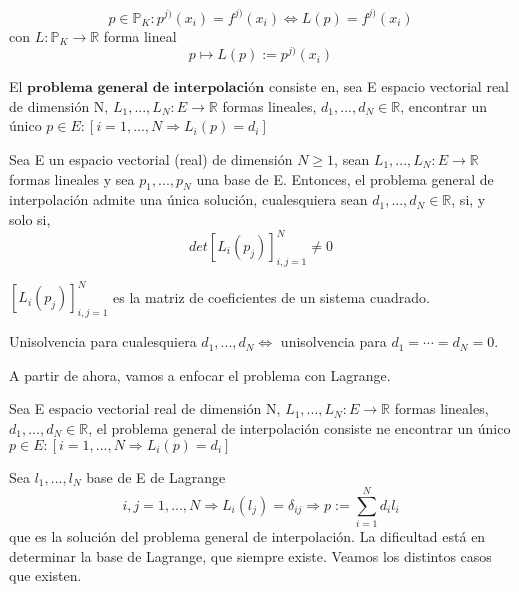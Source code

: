 \[ p \in \mathbb{P} _K : p^{j)}(x_i) = f^{j)}(x_i) \Leftrightarrow L(p) = f^{j)}(x_i) \]
con $L : \mathbb{P} _K \longrightarrow \mathbb{R}$ forma lineal
\[ p \mapsto L(p) := p^{j)}(x_i) \]

El $\textbf{problema general de interpolación}$ consiste en, sea E espacio vectorial real de dimensión N, $L_1,...,L_N : E \longrightarrow \mathbb{R}$ formas lineales, $d_1,...,d_N \in \mathbb{R}$, encontrar un único $p \in E : \left[  i=1,...,N \Rightarrow L_i(p) = d_i \right] $

\begin{nprop}
Sea E un espacio vectorial (real) de dimensión $N \geq 1$, sean $L_1,...,L_N : E \longrightarrow \mathbb{R}$ formas lineales y sea {$p_1,...,p_N$} una base de E. Entonces, el problema general de interpolación admite una única solución, cualesquiera sean $d_1,...,d_N \in \mathbb{R}$, si, y solo si,
\[ det \left[ L_i(p_j) \right] _{i,j=1}^N \neq 0 \]
\end{nprop}

$\left[ L_i(p_j) \right] _{i,j=1}^N$ es la matriz de coeficientes de un sistema cuadrado.

Unisolvencia para cualesquiera $d_1,...,d_N \Leftrightarrow$ unisolvencia para $d_1 = \cdots = d_N = 0$.

A partir de ahora, vamos a enfocar el problema con Lagrange.

Sea E espacio vectorial real de dimensión N, $L_1,...,L_N : E \longrightarrow \mathbb{R}$ formas lineales, $d_1,...,d_N \in \mathbb{R}$, el problema general de interpolación consiste ne encontrar un único $p \in E : \left[  i=1,...,N \Rightarrow L_i(p) = d_i \right]$

Sea {$l_1,...,l_N$} base de E de Lagrange
\[ i,j = 1,...,N \Rightarrow L_i(l_j) = \delta _{ij} \Rightarrow p:= \sum_{i=1}^N d_il_i \]
que es la solución del problema general de interpolación. La dificultad está en determinar la base de Lagrange, que siempre existe. Veamos los distintos casos que existen.

